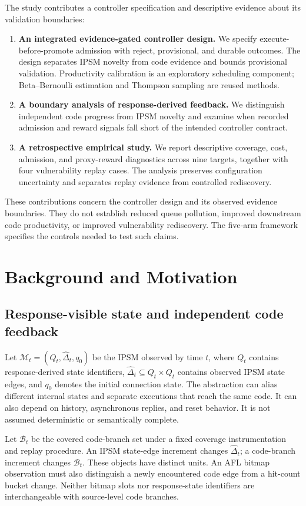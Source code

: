 \documentclass[final,5p,times,number]{elsarticle}
\begin{document}
The study contributes a controller specification and descriptive evidence about its validation boundaries:
\begin{enumerate}
\item \textbf{An integrated evidence-gated controller design.} We specify execute-before-promote admission with reject, provisional, and durable outcomes. The design separates IPSM novelty from code evidence and bounds provisional validation. Productivity calibration is an exploratory scheduling component; Beta--Bernoulli estimation and Thompson sampling are reused methods.
\item \textbf{A boundary analysis of response-derived feedback.} We distinguish independent code progress from IPSM novelty and examine when recorded admission and reward signals fall short of the intended controller contract.
\item \textbf{A retrospective empirical study.} We report descriptive coverage, cost, admission, and proxy-reward diagnostics across nine targets, together with four vulnerability replay cases. The analysis preserves configuration uncertainty and separates replay evidence from controlled rediscovery.
\end{enumerate}
These contributions concern the controller design and its observed evidence boundaries. They do not establish reduced queue pollution, improved downstream code productivity, or improved vulnerability rediscovery. The five-arm framework specifies the controls needed to test such claims.

\section{Background and Motivation}
\label{sec:motivation}
\subsection{Response-visible state and independent code feedback}
Let $\mathcal{M}_t=(Q_t,\widehat{\Delta}_t,q_0)$ be the IPSM observed by time $t$, where $Q_t$ contains response-derived state identifiers, $\widehat{\Delta}_t\subseteq Q_t\times Q_t$ contains observed IPSM state edges, and $q_0$ denotes the initial connection state. The abstraction can alias different internal states and separate executions that reach the same code. It can also depend on history, asynchronous replies, and reset behavior. It is not assumed deterministic or semantically complete.

Let $\mathcal{B}_t$ be the covered code-branch set under a fixed coverage instrumentation and replay procedure. An IPSM state-edge increment changes $\widehat{\Delta}_t$; a code-branch increment changes $\mathcal{B}_t$. These objects have distinct units. An AFL bitmap observation must also distinguish a newly encountered code edge from a hit-count bucket change. Neither bitmap slots nor response-state identifiers are interchangeable with source-level code branches.
\end{document}
